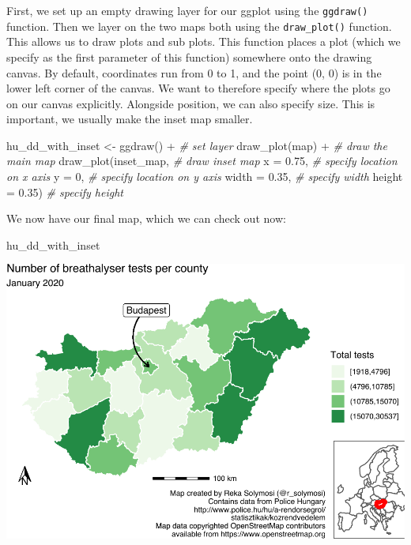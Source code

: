 \documentclass[
  krantz2]{krantz}
\makeatletter
\newenvironment{Shaded}{\begin{snugshade}}{\end{snugshade}}
\newcommand{\AttributeTok}[1]{\textcolor[rgb]{0.61,0.61,0.61}{#1}}
\newcommand{\CommentTok}[1]{\textcolor[rgb]{0.37,0.37,0.37}{\textit{#1}}}
\newcommand{\DecValTok}[1]{\textcolor[rgb]{0.06,0.06,0.06}{#1}}
\newcommand{\FloatTok}[1]{\textcolor[rgb]{0.06,0.06,0.06}{#1}}
\newcommand{\FunctionTok}[1]{\textcolor[rgb]{0,0,0}{#1}}
\newcommand{\NormalTok}[1]{#1}
\newcommand{\OtherTok}[1]{\textcolor[rgb]{0.37,0.37,0.37}{#1}}
\newcommand{\SpecialCharTok}[1]{\textcolor[rgb]{0,0,0}{#1}}
\newenvironment{kframe}{%
\medskip{}
\setlength{\fboxsep}{.8em}
 \def\at@end@of@kframe{}%
 \ifinner\ifhmode%
  \def\at@end@of@kframe{\end{minipage}}%
  \begin{minipage}{\columnwidth}%
 \fi\fi%
 \def\FrameCommand##1{\hskip\@totalleftmargin \hskip-\fboxsep
 \colorbox{shadecolor}{##1}\hskip-\fboxsep
     \hskip-\linewidth \hskip-\@totalleftmargin \hskip\columnwidth}%
 \MakeFramed {\advance\hsize-\width
   \@totalleftmargin\z@ \linewidth\hsize
   \@setminipage}}%
 {\par\unskip\endMakeFramed%
 \at@end@of@kframe}
\renewenvironment{Shaded}{\begin{kframe}}{\end{kframe}}
\makeatother
\begin{document}
First, we set up an empty drawing layer for our ggplot using the \texttt{ggdraw()} function. Then we layer on the two maps both using the \texttt{draw\_plot()} function. This allows us to draw plots and sub plots. This function places a plot (which we specify as the first parameter of this function) somewhere onto the drawing canvas. By default, coordinates run from 0 to 1, and the point (0, 0) is in the lower left corner of the canvas. We want to therefore specify where the plots go on our canvas explicitly. Alongside position, we can also specify size. This is important, we usually make the inset map smaller.

\begin{Shaded}
\begin{Highlighting}[]
\NormalTok{hu\_dd\_with\_inset }\OtherTok{\textless{}{-}} \FunctionTok{ggdraw}\NormalTok{() }\SpecialCharTok{+}  \CommentTok{\# set layer}
  \FunctionTok{draw\_plot}\NormalTok{(map) }\SpecialCharTok{+}  \CommentTok{\# draw the main map}
  \FunctionTok{draw\_plot}\NormalTok{(inset\_map,   }\CommentTok{\# draw inset map}
            \AttributeTok{x =} \FloatTok{0.75}\NormalTok{,    }\CommentTok{\# specify location on x axis}
            \AttributeTok{y =} \DecValTok{0}\NormalTok{,    }\CommentTok{\# specify location on y axis}
            \AttributeTok{width =} \FloatTok{0.35}\NormalTok{,    }\CommentTok{\# specify width}
            \AttributeTok{height =} \FloatTok{0.35}\NormalTok{)   }\CommentTok{\# specify height}
\end{Highlighting}
\end{Shaded}

We now have our final map, which we can check out now:

\begin{Shaded}
\begin{Highlighting}[]
\NormalTok{hu\_dd\_with\_inset}
\end{Highlighting}
\end{Shaded}

\includegraphics{crime_mapping_files/figure-latex/insetmapfinal-1.pdf}
\end{document}
